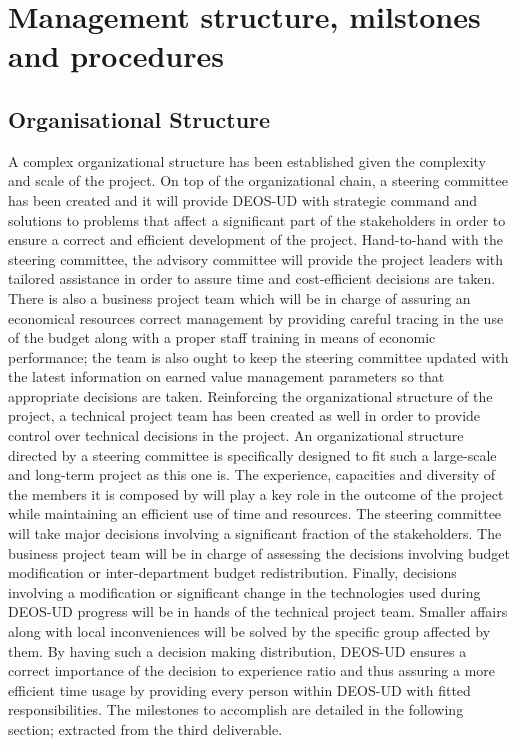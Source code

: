 \section{Management structure, milstones and procedures}

\subsection{Organisational Structure}

A complex organizational structure has been established given the complexity and scale of the project. On top of the organizational chain, a steering committee has been created and it will provide DEOS-UD with strategic command and solutions to problems that affect a significant part of the stakeholders in order to ensure a correct and efficient development of the project. Hand-to-hand with the steering committee, the advisory committee will provide the project leaders with tailored assistance in order to assure time and cost-efficient decisions are taken. There is also a business project team which will be in charge of assuring an economical resources correct management by providing careful tracing in the use of the budget along with a proper staff training in means of economic performance; the team is also ought to keep the steering committee updated with the latest information on earned value management parameters so that appropriate decisions are taken. Reinforcing the organizational structure of the project, a technical project team has been created as well in order to provide control over technical decisions in the project.
An organizational structure directed by a steering committee is specifically designed to fit such a large-scale and long-term project as this one is. The experience, capacities and diversity of the members it is composed by will play a key role in the outcome of the project while maintaining an efficient use of time and resources. The steering committee will take major decisions involving a significant fraction of the stakeholders. The business project team will be in charge of assessing the decisions involving budget modification or inter-department budget redistribution. Finally, decisions involving a modification or significant change in the technologies used during DEOS-UD progress will be in hands of the technical project team. Smaller affairs along with local inconveniences will be solved by the specific group affected by them. By having such a decision making distribution, DEOS-UD ensures a correct importance of the decision to experience ratio and thus assuring a more efficient time usage by providing every person within DEOS-UD with fitted responsibilities.
The milestones to accomplish are detailed in the following section; extracted from the third deliverable.      

